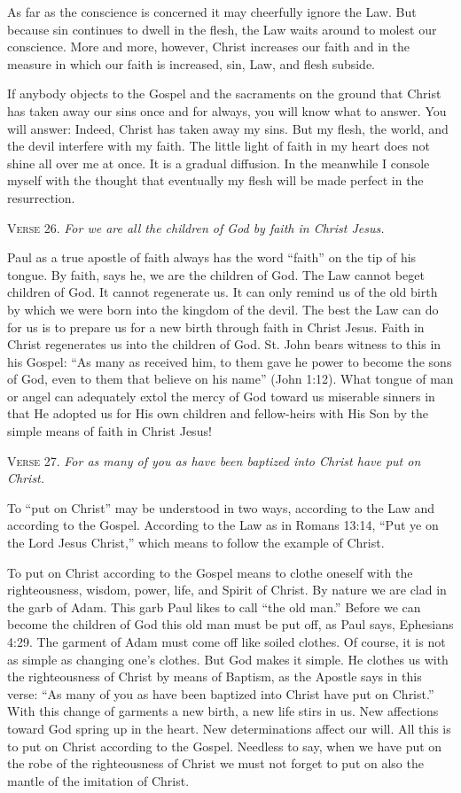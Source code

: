 As far as the conscience is concerned it may cheerfully ignore the Law. But because sin continues to dwell in the flesh, the Law waits around to molest our conscience. More and more, however, Christ increases our faith and in the measure in which our faith is increased, sin, Law, and flesh subside.

If anybody objects to the Gospel and the sacraments on the ground that Christ has taken away our sins once and for always, you will know what to answer. You will answer: Indeed, Christ has taken away my sins. But my flesh, the world, and the devil interfere with my faith. The little light of faith in my heart does not shine all over me at once. It is a gradual diffusion. In the meanwhile I console myself with the thought that eventually my flesh will be made perfect in the resurrection.

\textsc{Verse} 26. \emph{For we are all the children of God by faith in Christ Jesus.}

Paul as a true apostle of faith always has the word “faith” on the tip of his tongue. By faith, says he, we are the children of God. The Law cannot beget children of God. It cannot regenerate us. It can only remind us of the old birth by which we were born into the kingdom of the devil. The best the Law can do for us is to prepare us for a new birth through faith in Christ Jesus. Faith in Christ regenerates us into the children of God. St. John bears witness to this in his Gospel: “As many as received him, to them gave he power to become the sons of God, even to them that believe on his name” (John 1:12). What tongue of man or angel can adequately extol the mercy of God toward us miserable sinners in that He adopted us for His own children and fellow-heirs with His Son by the simple means of faith in Christ Jesus!

\textsc{Verse} 27. \emph{For as many of you as have been baptized into Christ have put on Christ.}

To “put on Christ” may be understood in two ways, according to the Law and according to the Gospel. According to the Law as in Romans 13:14, “Put ye on the Lord Jesus Christ,” which means to follow the example of Christ.

To put on Christ according to the Gospel means to clothe oneself with the righteousness, wisdom, power, life, and Spirit of Christ. By nature we are clad in the garb of Adam. This garb Paul likes to call “the old man.” Before we can become the children of God this old man must be put off, as Paul says, Ephesians 4:29. The garment of Adam must come off like soiled clothes. Of course, it is not as simple as changing one’s clothes. But God makes it simple. He clothes us with the righteousness of Christ by means of Baptism, as the Apostle says in this verse: “As many of you as have been baptized into Christ have put on Christ.” With this change of garments a new birth, a new life stirs in us. New affections toward God spring up in the heart. New determinations affect our will. All this is to put on Christ according to the Gospel. Needless to say, when we have put on the robe of the righteousness of Christ we must not forget to put on also the mantle of the imitation of Christ.

